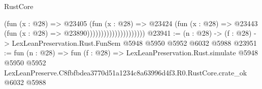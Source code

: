 \begin{lexlean}{RustCore}
\begin{coremodule}
                                      (fun (x : @28) =>
                                      @23405
                                        (fun (x : @28) =>
                                        @23424
                                          (fun (x : @28) =>
                                          @23443 (fun (x : @28) => @23890)))))))))))))))))))))
@23941 := (n : @28) -> (f : @28) -> LexLeanPreservation.Rust.FunSem @5948 @5950 @5952 @6032 @5988
@23951 := fun (n : @28) =>
  fun (f : @28) =>
  LexLeanPreservation.Rust.simulate
    @5948
    @5950
    @5952
    LexLeanPreserve.C8fbfbdea3770d51a1234c8a63996d4f3.R0.RustCore.crate_ok
    @6032
    @5988
\end{coremodule}
\end{lexlean}
